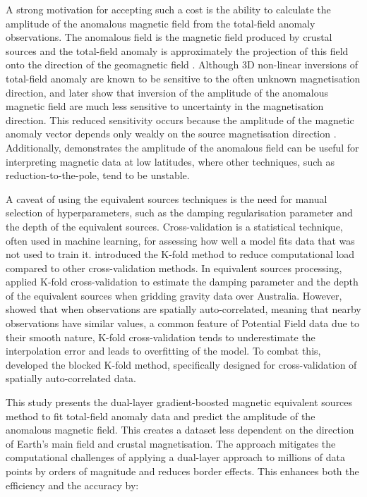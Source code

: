 A strong motivation for accepting such a cost is the ability to calculate the amplitude of the anomalous magnetic field from the total-field anomaly observations. The anomalous field is the magnetic field produced by crustal sources and the total-field anomaly is approximately the projection of this field onto the direction of the geomagnetic field \citep{Blakley1995}. Although 3D non-linear inversions of total-field anomaly are known to be sensitive to the often unknown magnetisation direction, \citet{Li2010_remanent} and later \citet{HidalgoGato2021} show that inversion of the amplitude of the anomalous magnetic field are much less sensitive to uncertainty in the magnetisation direction. This reduced sensitivity occurs because the amplitude of the magnetic anomaly vector depends only weakly on the source magnetisation direction \citep{Nabighian1984, Haney2003}. Additionally, \citet{Melo2021} demonstrates the amplitude of the anomalous field can be useful for interpreting magnetic data at low latitudes, where other techniques, such as reduction-to-the-pole, tend to be unstable.

A caveat of using the equivalent sources techniques is the need for manual selection of hyperparameters, such as the damping regularisation parameter and the depth of the equivalent sources. Cross-validation is a statistical technique, often used in machine learning, for assessing how well a model fits data that was not used to train it. \citet{Geisser1975} introduced the K-fold method to reduce computational load compared to other cross-validation methods. In equivalent sources processing, \citet{Soler2021} applied K-fold cross-validation to estimate the damping parameter and the depth of the equivalent sources when gridding gravity data over Australia. However, \citet{Roberts2017} showed that when observations are spatially auto-correlated, meaning that nearby observations have similar values, a common feature of Potential Field data due to their smooth nature, K-fold cross-validation tends to underestimate the interpolation error and leads to overfitting of the model. To combat this, \citet{Roberts2017} developed the blocked K-fold method, specifically designed for cross-validation of spatially auto-correlated data.

This study presents the dual-layer gradient-boosted magnetic equivalent sources method to fit total-field anomaly data and predict the amplitude of the anomalous magnetic field. This creates a dataset less dependent on the direction of Earth’s main field and crustal magnetisation. The approach mitigates the computational challenges of applying a dual-layer approach to millions of data points by orders of magnitude and reduces border effects. This enhances both the efficiency and the accuracy by:

